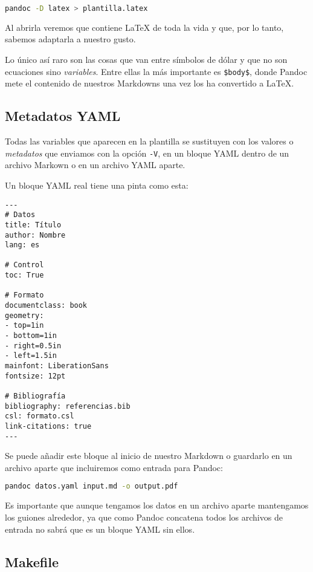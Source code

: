 \begin{lstlisting}[language=bash]
pandoc -D latex > plantilla.latex
\end{lstlisting}

Al abrirla veremos que contiene LaTeX de toda la vida y que, por lo
tanto, sabemos adaptarla a nuestro gusto.

Lo único así raro son las cosas que van entre símbolos de dólar y que no
son ecuaciones sino \emph{variables}. Entre ellas la más importante es
\lstinline!$body$!, donde Pandoc mete el contenido de nuestros Markdowns
una vez los ha convertido a LaTeX.

\subsection{Metadatos YAML}

Todas las variables que aparecen en la plantilla se sustituyen con los
valores o \emph{metadatos} que enviamos con la opción \lstinline!-V!, en
un bloque YAML dentro de un archivo Markown o en un archivo YAML aparte.

Un bloque YAML real tiene una pinta como esta:

\begin{lstlisting}
---
# Datos
title: Título 
author: Nombre
lang: es

# Control
toc: True

# Formato
documentclass: book
geometry:
- top=1in
- bottom=1in
- right=0.5in
- left=1.5in
mainfont: LiberationSans
fontsize: 12pt

# Bibliografía
bibliography: referencias.bib
csl: formato.csl
link-citations: true
---
\end{lstlisting}

Se puede añadir este bloque al inicio de nuestro Markdown o guardarlo en
un archivo aparte que incluiremos como entrada para Pandoc:

\begin{lstlisting}[language=bash]
pandoc datos.yaml input.md -o output.pdf
\end{lstlisting}

Es importante que aunque tengamos los datos en un archivo aparte
mantengamos los guiones alrededor, ya que como Pandoc concatena todos
los archivos de entrada no sabrá que es un bloque YAML sin ellos.

\subsection{Makefile}

